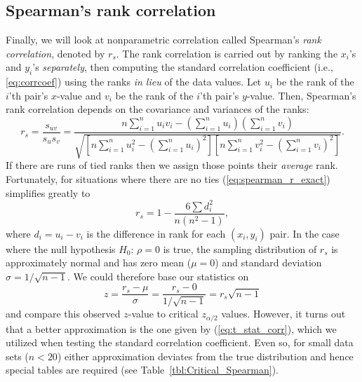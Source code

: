 \subsection{Spearman's rank correlation}

	Finally, we will look at nonparametric correlation called Spearman's \emph{rank correlation},
denoted by $r_s$.  The rank correlation is carried out by ranking the $x_i$'s and $y_i$'s 
\emph{separately}, then computing the standard correlation coefficient (i.e., \ref{eq:corrcoef}) using the ranks \emph{in lieu} of the data values. Let
$u_i$ be the rank of the $i$'th pair's $x$-value and $v_i$ be the rank of the $i$'th pair's $y$-value.  Then,
Spearman's rank correlation depends on the covariance and variances of the ranks: 
\begin{equation}
r_s = \frac{s_{uv}}{s_u s_v} = \frac{n \sum_{i=1}^n u_i v_i - \left(\sum_{i=1}^n u_i \right)\left(\sum_{i=1}^n v_i \right)}{\sqrt{\left [n \sum_{i=1}^n u_i^2 - \left(\sum_{i=1}^n u_i \right)^2 \right] \left [n \sum_{i=1}^n v_i^2 - \left(\sum_{i=1}^n v_i \right)^2 \right]}}.
\label{eq:spearman_r_exact}
\end{equation}
If there are runs of tied ranks then we assign those points their \emph{average} rank. Fortunately, for
situations where there are no ties (\ref{eq:spearman_r_exact}) simplifies greatly to
\begin{equation}
r_s = 1 - \frac{6\sum d^2_i}{n(n^2 - 1)},
\label{eq:spearman_r}
\end{equation}
where $d_i = u_i - v_i$ is the difference in rank for each $(x_i, y_i)$ pair.
In the case where the null hypothesis $H_0$: $\rho = 0$ is true, the sampling distribution of $r_s$ is approximately normal and
has zero mean ($\mu = 0$) and standard deviation $\sigma = 1/\sqrt{n-1}$.  We could therefore base our statistics on 
\begin{equation}
z = \frac{r_s - \mu}{\sigma} = \frac{r_s - 0}{1/\sqrt{n-1}} = r _s\sqrt{n-1}
\label{eq:z_spearman}
\end{equation}
and compare this observed $z$-value to critical $z_{ \alpha / 2}$ values.
However, it turns out that a better approximation is the one given by (\ref{eq:t_stat_corr}), which we utilized when testing
the standard correlation coefficient.  Even so, for small data sets ($n < 20$) either approximation deviates
from the true distribution and hence special tables are required (see Table~\ref{tbl:Critical_Spearman}).

